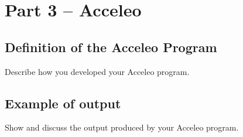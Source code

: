 \section{Part 3 -- Acceleo}

\subsection{Definition of the Acceleo Program}

Describe how you developed your Acceleo program.

\subsection{Example of output}

Show and discuss the output produced by your Acceleo program.


